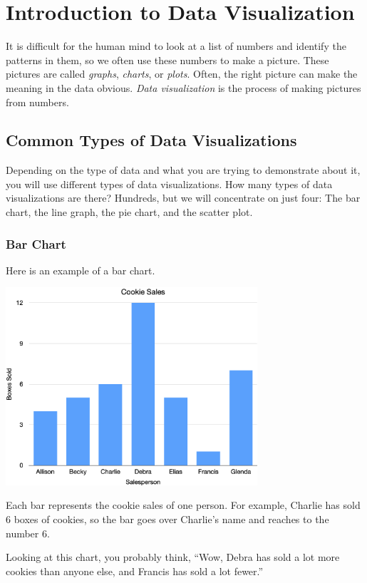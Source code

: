 \chapter{Introduction to Data Visualization}

It is difficult for the human mind to look at a list of numbers and
identify the patterns in them, so we often use these numbers to make a picture. These pictures are called \textit{graphs},
\textit{charts}, or \textit{plots}. Often, the right picture can make
the meaning in the data obvious. \textit{Data visualization} is the
process of making pictures from numbers.

\section{Common Types of Data Visualizations}

Depending on the type of data and what you are trying to demonstrate
about it, you will use different types of data visualizations.  How
many types of data visualizations are there? Hundreds, but we will
concentrate on just four: The bar chart, the line graph, the pie
chart, and the scatter plot.

\subsection{Bar Chart}

Here is an example of a bar chart.

\includegraphics[width=0.7\textwidth]{CookieChart.png}

Each bar represents the cookie sales of one person. For example,
Charlie has sold 6 boxes of cookies, so the bar goes over Charlie's
name and reaches to the number 6.

Looking at this chart, you probably think, ``Wow, Debra has sold a lot
more cookies than anyone else, and Francis has sold a lot fewer.''

